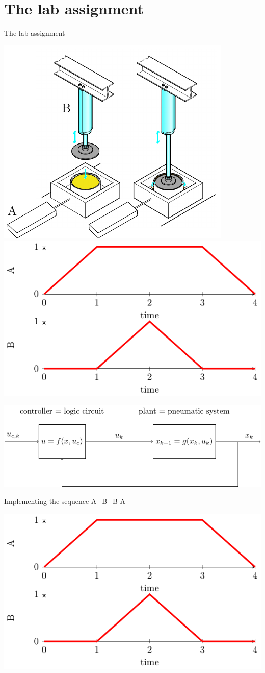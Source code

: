 \documentclass[presentation,aspectratio=1610]{beamer}
\begin{document}
\section{The lab assignment}
\label{sec:orgea5e4dc}


\begin{frame}[label={sec:org046a189}]{The lab assignment}
\begin{center}
\includegraphics[width=0.4\linewidth]{../../figures/cheese-pressing-two-cylinders}
 \includegraphics[width=0.58\linewidth]{../../figures/AplusBplusBminAmin}
\end{center}

\begin{center}
\includegraphics[width=0.8\linewidth]{../../figures/logic-control-loop}
\end{center}
\end{frame}

\begin{frame}[label={sec:org0b6f7db}]{Implementing the sequence A+B+B-A-}
\begin{center}
\includegraphics[width=0.8\linewidth]{../../figures/AplusBplusBminAmin}
\end{center}
\end{frame}
\end{document}
